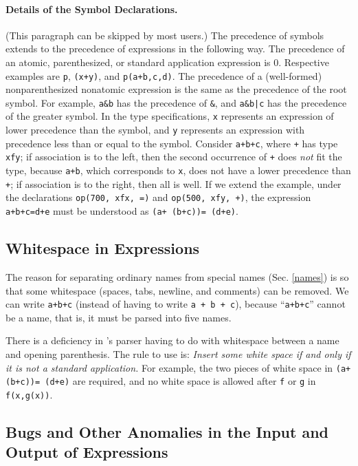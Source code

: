 \documentclass[11pt]{article}
\begin{document}
\paragraph{Details of the Symbol Declarations.}
(This paragraph can be skipped by most users.)
The precedence of symbols extends to the precedence of expressions in
the following way.  The precedence of an atomic, parenthesized, or
standard application expression is 0.  Respective examples are
\verb:p:, \verb:(x+y):, and \verb:p(a+b,c,d):.  The precedence of a
(well-formed) nonparenthesized nonatomic expression is the same
as the precedence of the root symbol.  For example, \verb:a&b: has
the precedence of \verb:&:, and \verb:a&b|c: has the precedence of the
greater symbol.  In the type specifications, \verb:x: represents an
expression of lower precedence than the symbol, and \verb:y:
represents an expression with precedence less than or equal to the
symbol.  Consider \verb:a+b+c:, where \verb:+: has type \verb:xfy:;
if association is to the left, then the second occurrence of \verb:+:
does {\em not} fit the type, because \verb:a+b:, which corresponds to
\verb:x:, does not have a lower precedence than \verb:+:; if association
is to the right, then all is well.  If we extend the example, under the
declarations \verb:op(700, xfx, =): and \verb:op(500, xfy, +):,
the expression \verb:a+b+c=d+e: must be understood as \verb:(a+ (b+c))= (d+e):.

\subsection{Whitespace in Expressions}

The reason for separating ordinary names from special names (Sec.
\ref{names}) is so that some whitespace (spaces, tabs, newline, and comments)
can be removed.  We can write \verb:a+b+c: (instead of having to write
\verb:a + b + c:), because ``\verb:a+b+c:'' cannot be a name, that is, it
must be parsed into five names.

  There is a deficiency in \otter's parser
having to do with whitespace between a name and opening parenthesis.
The rule to use is: {\em Insert some white space if and only if it is
{\em not} a standard application.}  For example, the two pieces of
white space in \verb:(a+ (b+c))= (d+e): are required, and no white space
is allowed after \verb:f: or \verb:g: in \verb:f(x,g(x)):.

\subsection{Bugs and Other Anomalies in the Input and Output of Expressions}
\end{document}
